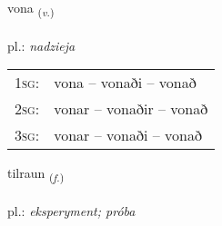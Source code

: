 \documentclass[frontgrid, backgrid]{flacards}\usepackage[]{graphicx}\usepackage[]{xcolor}
\begin{document}
\renewcommand{\flhead}{\vskip5pt \fboxsep=0pt {\small\bfseries\footnotesize Sagnorð | czasownik}}
\renewcommand{\fcfoot}{\vskip5pt \fboxsep=0pt \hspace{2pt}{\small\bfseries\footnotesize 1K}}

\renewcommand{\blhead}{\vskip5pt {\small\bfseries\footnotesize Sagnorð | czasownik }}
\renewcommand{\bcfoot}{\vskip5pt \hspace{2pt}{\small\bfseries\footnotesize 1K}}


{vona \small{\textsubscript{(\textit{v.})}} \\[1ex] %
\textphonetic{[vɔːna]} \\
pl.: \emph{nadzieja} \\  [2ex]
\renewcommand*{\arraystretch}{0.8}
\begin{tabular}{p{1cm}l}
\textsc{1sg}: & vona -- vonaði -- vonað \\ 
\textsc{2sg}: & vonar -- vonaðir -- vonað \\ 
\textsc{3sg}: & vonar -- vonaði -- vonað \\ 
\end{tabular}
}

\renewcommand{\flhead}{\vskip5pt \fboxsep=0pt {\small\bfseries\footnotesize Nafnorð | rzeczownik}}
\renewcommand{\fcfoot}{\vskip5pt \fboxsep=0pt \hspace{2pt}{\small\bfseries\footnotesize 1K}}

\renewcommand{\blhead}{\vskip5pt {\small\bfseries\footnotesize Nafnorð | rzeczownik }}
\renewcommand{\bcfoot}{\vskip5pt \hspace{2pt}{\small\bfseries\footnotesize 1K}}


{tilraun \small{\textsubscript{(\textit{f.})}} \\[1ex] %
\textphonetic{[tʰɪlrœin]} \\
pl.: \emph{eksperyment; próba} \\  [2ex]
\renewcommand*{\arraystretch}{0.8}
}
\end{document}
